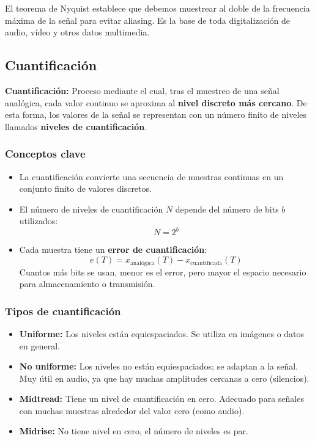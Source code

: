 \documentclass[11pt,a4paper]{article}
\begin{document}
\begin{ResumenBox}
El teorema de Nyquist establece que debemos muestrear al doble de la frecuencia máxima de la señal para evitar aliasing.
Es la base de toda digitalización de audio, vídeo y otros datos multimedia.
\end{ResumenBox}

\subsection{Cuantificación}

\begin{DefBox}
\textbf{Cuantificación:}
Proceso mediante el cual, tras el muestreo de una señal analógica, cada valor continuo se aproxima al \textbf{nivel discreto más cercano}.
De esta forma, los valores de la señal se representan con un número finito de niveles llamados \textbf{niveles de cuantificación}.
\end{DefBox}

\subsubsection*{Conceptos clave}
\begin{itemize}
  \item La cuantificación convierte una secuencia de muestras continuas en un conjunto finito de valores discretos.
  \item El número de niveles de cuantificación $N$ depende del número de bits $b$ utilizados:
  \[
  N = 2^b
  \]
  \item Cada muestra tiene un \textbf{error de cuantificación}:
  \[
  e(T) = x_{\text{analógica}}(T) - x_{\text{cuantificada}}(T)
  \]
  Cuantos más bits se usan, menor es el error, pero mayor el espacio necesario para almacenamiento o transmisión.
\end{itemize}

\subsubsection*{Tipos de cuantificación}
\begin{itemize}
  \item \textbf{Uniforme:} Los niveles están equiespaciados.
  Se utiliza en imágenes o datos en general.
  \item \textbf{No uniforme:} Los niveles no están equiespaciados; se adaptan a la señal.
  Muy útil en audio, ya que hay muchas amplitudes cercanas a cero (silencios).
  \item \textbf{Midtread:} Tiene un nivel de cuantificación en cero.
  Adecuado para señales con muchas muestras alrededor del valor cero (como audio).
  \item \textbf{Midrise:} No tiene nivel en cero, el número de niveles es par.
\end{itemize}
\end{document}
